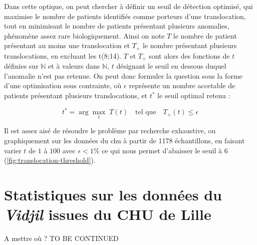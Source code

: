 \vspace{1em}

Dans cette optique, on peut chercher à définir un seuil de détection optimisé, qui maximise le nombre de patients identifiés comme porteurs d'une translocation, 
tout en minimisant le nombre de patients présentant plusieurs anomalies, phénomène assez rare biologiquement. Ainsi on note $T$ le nombre de patient 
présentant au moins une translocation et $T_{+}$ le nombre présentant plusieurs translocations, en excluant les t(8;14). $T$ et $T_{+}$ sont alors des fonctions 
de $t$ définies sur $\mathbb{N}$ et à valeurs dans $\mathbb{N}$, $t$ désignant le seuil en dessous duquel l'anomalie n'est pas retenue. On peut donc formuler la question sous la forme d'une optimisation sous contrainte, 
où $\epsilon$ représente un nombre accetable de patients présentant plusieurs translocations, et $t^*$ le seuil optimal retenu :

\begin{equation}
    t^* = \arg\max_{t} \; T(t) \quad \text{tel que} \quad T_{+}(t) \leq \epsilon
 \end{equation}
    
 Il est assez aisé de résoudre le problème par recherche exhaustive, ou graphiquement sur les données du \gls{chu} à partir de 1178 échantillons, en faisant varier 
 $t$ de $1$ à $100$ avec $\epsilon < 1 \%$ ce qui nous permet d'abaisser le seuil à 6 (\autoref{fig:translocation-threshold}).



\section{Statistiques sur les données du \textit{Vidjil} issues du CHU de Lille}

A mettre où ?
TO BE CONTINUED